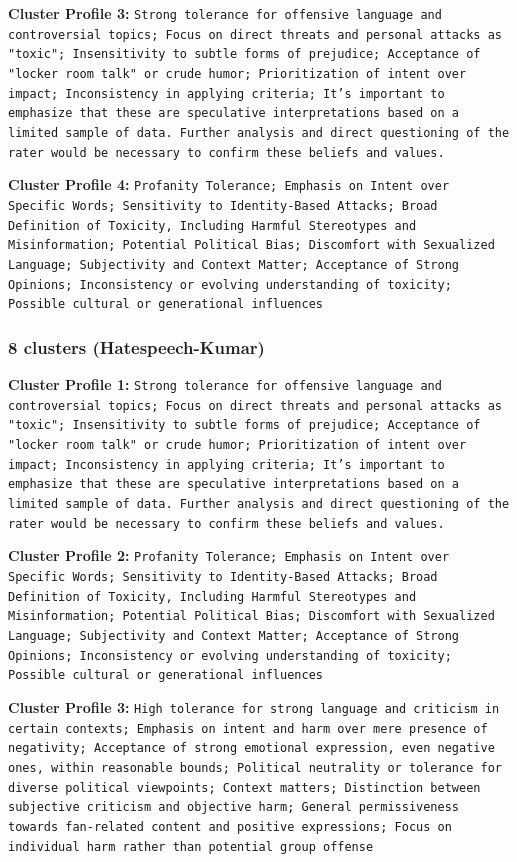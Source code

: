 \documentclass[11pt]{article}
\begin{document}
\textbf{Cluster Profile 3:} \texttt{Strong tolerance for offensive language and controversial topics; Focus on direct threats and personal attacks as "toxic"; Insensitivity to subtle forms of prejudice; Acceptance of "locker room talk" or crude humor; Prioritization of intent over impact; Inconsistency in applying criteria; It's important to emphasize that these are speculative interpretations based on a limited sample of data.  Further analysis and direct questioning of the rater would be necessary to confirm these beliefs and values.}

\textbf{Cluster Profile 4:} \texttt{Profanity Tolerance; Emphasis on Intent over Specific Words; Sensitivity to Identity-Based Attacks; Broad Definition of Toxicity, Including Harmful Stereotypes and Misinformation; Potential Political Bias; Discomfort with Sexualized Language; Subjectivity and Context Matter; Acceptance of Strong Opinions; Inconsistency or evolving understanding of toxicity; Possible cultural or generational influences}

\subsubsection{8 clusters (Hatespeech-Kumar)}

\textbf{Cluster Profile 1:} \texttt{Strong tolerance for offensive language and controversial topics; Focus on direct threats and personal attacks as "toxic"; Insensitivity to subtle forms of prejudice; Acceptance of "locker room talk" or crude humor; Prioritization of intent over impact; Inconsistency in applying criteria; It's important to emphasize that these are speculative interpretations based on a limited sample of data.  Further analysis and direct questioning of the rater would be necessary to confirm these beliefs and values.}

\textbf{Cluster Profile 2:} \texttt{Profanity Tolerance; Emphasis on Intent over Specific Words; Sensitivity to Identity-Based Attacks; Broad Definition of Toxicity, Including Harmful Stereotypes and Misinformation; Potential Political Bias; Discomfort with Sexualized Language; Subjectivity and Context Matter; Acceptance of Strong Opinions; Inconsistency or evolving understanding of toxicity; Possible cultural or generational influences}

\textbf{Cluster Profile 3:} \texttt{High tolerance for strong language and criticism in certain contexts; Emphasis on intent and harm over mere presence of negativity; Acceptance of strong emotional expression, even negative ones, within reasonable bounds; Political neutrality or tolerance for diverse political viewpoints; Context matters; Distinction between subjective criticism and objective harm; General permissiveness towards fan-related content and positive expressions; Focus on individual harm rather than potential group offense}
\end{document}
